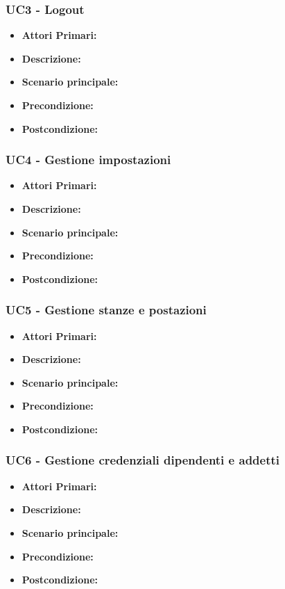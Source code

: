 \subsubsection{ UC3 - Logout}
\begin{itemize}
           	\item\textbf{Attori Primari:} 
           	\item\textbf{Descrizione:} 
           	\item\textbf{Scenario principale:} 
           	\item\textbf{Precondizione:} 
           	\item\textbf{Postcondizione:}
\end{itemize}

\subsubsection{ UC4 - Gestione impostazioni}
\begin{itemize}
           	\item\textbf{Attori Primari:} 
           	\item\textbf{Descrizione:} 
           	\item\textbf{Scenario principale:} 
           	\item\textbf{Precondizione:} 
           	\item\textbf{Postcondizione:}
\end{itemize}

\subsubsection{ UC5 -  Gestione stanze e postazioni}
\begin{itemize}
           	\item\textbf{Attori Primari:} 
           	\item\textbf{Descrizione:} 
           	\item\textbf{Scenario principale:} 
           	\item\textbf{Precondizione:} 
           	\item\textbf{Postcondizione:}
\end{itemize}

\subsubsection{ UC6 - Gestione credenziali dipendenti e addetti}
\begin{itemize}
           	\item\textbf{Attori Primari:} 
           	\item\textbf{Descrizione:} 
           	\item\textbf{Scenario principale:} 
           	\item\textbf{Precondizione:} 
           	\item\textbf{Postcondizione:}
\end{itemize}

